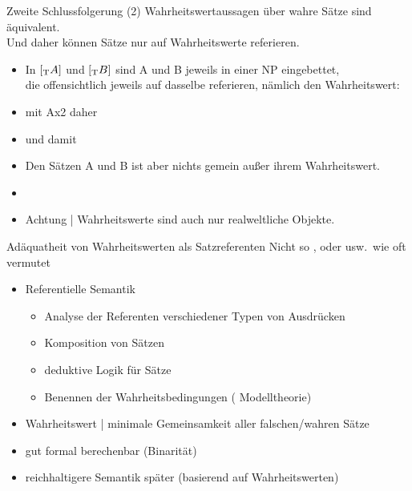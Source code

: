 \begin{frame}
  {Zweite Schlussfolgerung}
  \onslide<+->
  \onslide<+->
  (2) Wahrheitswertaussagen über wahre Sätze sind äquivalent.\\
  \alert{Und daher können Sätze nur auf Wahrheitswerte referieren.}\\
  \Halbzeile
  \begin{itemize}[<+->]
    \item In $[_{\text{T}}A]$ und $[_{\text{T}}B]$ sind A und B jeweils in einer NP eingebettet,\\
      die offensichtlich jeweils auf dasselbe referieren, nämlich den Wahrheitswert:\\
      \Halbzeile
    \item[ ] mit Ax2 daher \gruen{$\den{[\Sub{T}A]}=\den{[\Sub{T}B]}$}
    \item[ ] und damit 
      \Halbzeile
    \item Den Sätzen A und B ist aber nichts gemein außer ihrem Wahrheitswert.
    \item {}
    \item Achtung | \alert{Wahrheitswerte sind auch nur realweltliche Objekte.}
  \end{itemize}
  \Halbzeile
  \centering 
  \onslide<+->
\end{frame}

\begin{frame}
  {Adäquatheit von Wahrheitswerten als Satzreferenten}
  \onslide<+->
  \onslide<+->
  Nicht so ,  oder  usw.\ wie oft vermutet\\
  \Zeile
  \begin{itemize}[<+->]
    \item Referentielle Semantik
      \begin{itemize}[<+->]
        \item Analyse der Referenten verschiedener Typen von Ausdrücken
        \item Komposition von Sätzen
        \item deduktive Logik für Sätze
        \item \alert{Benennen der Wahrheitsbedingungen} ( Modelltheorie)
      \end{itemize}
      \Halbzeile
    \item Wahrheitswert | minimale Gemeinsamkeit \alert{aller} falschen\slash wahren Sätze
    \item gut formal berechenbar (Binarität)
    \item reichhaltigere Semantik später (basierend auf Wahrheitswerten)
  \end{itemize}
\end{frame}

